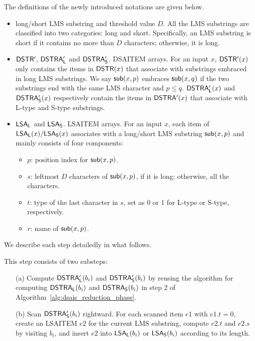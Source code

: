 \documentclass[10pt,journal,compsoc]{IEEEtran}
\begin{document}
The definitions of the newly introduced notations are given below.

\begin{itemize}[itemindent = 0ex]
	\item long/short LMS substring and threshold value $D$. All the LMS substrings are classified into two categories: long and short. Specifically, an LMS substring is short if it contains no more than $D$ characters; otherwise, it is long.
	
	\item ${\sf DSTR'}$, ${\sf DSTRA_L'}$ and ${\sf DSTRA_S'}$. DSAITEM arrays. For an input $x$, ${\sf DSTR'}(x)$ only contains the items in ${\sf DSTR}(x)$ that associate with substrings embraced in long LMS substrings. We say ${\sf sub}(x, p)$ embraces ${\sf sub}(x, q)$ if the two substrings end with the same LMS character and $p \le q$. ${\sf DSTRA_L'}(x)$ and ${\sf DSTRA_S'}(x)$ respectively contain the items in ${\sf DSTRA'}(x)$ that associate with L-type and S-type substrings.
	
	\item ${\sf LSA_L}$ and ${\sf LSA_S}$. LSAITEM arrays. For an input $x$, each item of ${\sf LSA_L}(x)/{\sf LSA_S}(x)$ associates with a long/short LMS substring ${\sf sub}(x, p)$ and mainly consists of four components:
	
	\begin{itemize}
		\item $p$: position index for ${\sf sub}(x, p)$.
		
		\item $s$: leftmost $D$ characters of ${\sf sub}(x, p)$, if it is long; otherwise, all the characters.
		
		\item $t$: type of the last character in $s$, set as 0 or 1 for L-type or S-type, respectively.
		
		\item $r$: name of ${\sf sub}(x, p)$.
		
	\end{itemize}
	
\end{itemize}

We describe each step detailedly in what follows.

\vspace{2ex} 

\noindent This step consists of two substeps:

\begin{itemize}[itemindent = 1ex]
	\item [(a)] Compute ${\sf DSTRA_L'}(b_i)$ and ${\sf DSTRA_S'}(b_i)$ by reusing the algorithm for computing ${\sf DSTRA_L}(b_i)$ and ${\sf DSTRA_S}(b_i)$ in step 2 of Algorithm~\ref{alg:dsais_reduction_phase}.
	
	\item [(b)] Scan ${\sf DSTRA_S'}(b_i)$ rightward. For each scanned item $e1$ with $e1.t = 0$, create an LSAITEM $e2$ for the current LMS substring, compute $e2.t$ and $e2.s$ by visiting $b_i$, and insert $e2$ into ${\sf LSA_L}(b_i)$ or ${\sf LSA_S}(b_i)$ according to its length.
\end{itemize}
\end{document}
